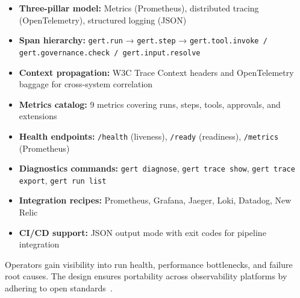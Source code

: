 \begin{itemize}
  \item \textbf{Three-pillar model:} Metrics (Prometheus), distributed tracing (OpenTelemetry), structured logging (JSON)
  \item \textbf{Span hierarchy:} \texttt{gert.run} → \texttt{gert.step} → \texttt{gert.tool.invoke / gert.governance.check / gert.input.resolve}
  \item \textbf{Context propagation:} W3C Trace Context headers and OpenTelemetry baggage for cross-system correlation
  \item \textbf{Metrics catalog:} 9 metrics covering runs, steps, tools, approvals, and extensions
  \item \textbf{Health endpoints:} \texttt{/health} (liveness), \texttt{/ready} (readiness), \texttt{/metrics} (Prometheus)
  \item \textbf{Diagnostics commands:} \texttt{gert diagnose}, \texttt{gert trace show}, \texttt{gert trace export}, \texttt{gert run list}
  \item \textbf{Integration recipes:} Prometheus, Grafana, Jaeger, Loki, Datadog, New Relic
  \item \textbf{CI/CD support:} JSON output mode with exit codes for pipeline integration
\end{itemize}

Operators gain visibility into run health, performance bottlenecks, and failure root causes. The design ensures portability across observability platforms by adhering to open standards~\cite{otel-spec, w3c-trace-context, google-sre-book}.
